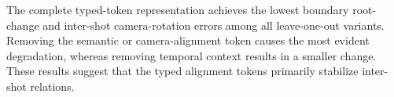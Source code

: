 \begin{table}[t]
  \centering
  \caption{Inference-time sensitivity of the alignment tokens on ten
  held-out extreme-viewpoint MVHuman sequences. Boundary root $\Delta$ measures
  error in the predicted root-position change across the transition. All settings use the same
  checkpoint and annotated boundary, masking only the indicated
  token. Human errors are in mm, camera rotation in degrees, and
  camera translation in m; lower is better.}
  \label{tab:mvhuman-token-sensitivity}
  \small
  \resizebox{\columnwidth}{!}{}
\end{table}

The complete typed-token representation achieves the lowest boundary root-change
and inter-shot camera-rotation errors among all leave-one-out variants. Removing the semantic
or camera-alignment token causes the most evident degradation, whereas
removing temporal context results in a smaller change. These results suggest
that the typed alignment tokens primarily stabilize inter-shot relations.
